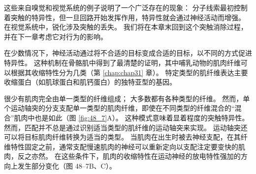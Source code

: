 这些来自嗅觉和视觉系统的例子说明了一个广泛存在的现象：
分子线索最初控制着突触的特异性，但一旦回路开始发挥作用，特异性就会通过神经活动而增强。
在视觉系统中，锐化涉及突触的丢失。
我们将在本章末回到这个突触消除过程，并在下一章考虑它对行为的影响。


在少数情况下，神经活动通过将不合适的目标变成合适的目标，以不同的方式促进特异性。
这种机制在骨骼肌中得到了最清楚的证明，其中哺乳动物的肌肉纤维可以根据其收缩特性分为几类（第 \ref{chap:chap31} 章）。
特定类型的肌纤维表达主要收缩蛋白（如肌球蛋白和肌钙蛋白）的独特亚型的基因。


很少有肌肉完全由单一类型的纤维组成； 大多数都有各种类型的纤维。
然而，单个运动轴突的分支支配单一类型的肌肉纤维，即使在不同类型的纤维混合的“混合”肌肉中也是如此（图 \ref{fig:48_7}A）。
这种模式意味着显着程度的突触特异性。
然而，匹配并不总是通过识别适当类型的肌纤维的运动轴突来实现。
运动轴突还可以将目标肌肉纤维转换为适当的类型。
当肌肉在出生时被去神经支配，在其纤维特性固定之前，通常支配慢速肌肉的神经可以重新定向以支配注定要变快的肌肉，反之亦然。
在这些条件下，肌肉的收缩特性在运动神经的放电特性强加的方向上发生部分变化（图 48–7B、C）。


